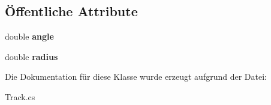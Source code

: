 \subsection*{Öffentliche Attribute}
\begin{DoxyCompactItemize}
\item 
\hypertarget{class_robot_ctrl_1_1_track_arc_right_a6e5fa9d8296e05e45d3db261997e224e}{
double {\bfseries angle}}
\label{class_robot_ctrl_1_1_track_arc_right_a6e5fa9d8296e05e45d3db261997e224e}

\item 
\hypertarget{class_robot_ctrl_1_1_track_arc_right_a499b381000fccf8f8c3af0ea1940a996}{
double {\bfseries radius}}
\label{class_robot_ctrl_1_1_track_arc_right_a499b381000fccf8f8c3af0ea1940a996}

\end{DoxyCompactItemize}


Die Dokumentation für diese Klasse wurde erzeugt aufgrund der Datei:\begin{DoxyCompactItemize}
\item 
Track.cs\end{DoxyCompactItemize}
